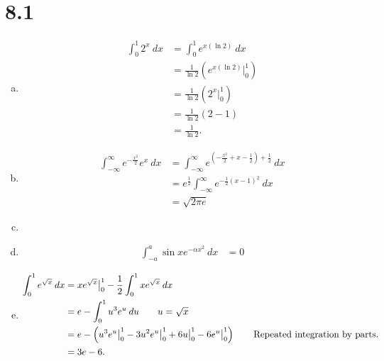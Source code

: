 \documentclass[10pt]{mypackage}
\begin{document}
\RaggedRight
\section{8.1}%
\begin{enumerate}[(a)]
  \item 
    \begin{align*}
      \int_{0}^{1} 2^x\:dx &= \int_{0}^{1} e^{x\left(\ln 2\right)}\:dx\\
                           &= \frac{1}{\ln 2}\left(e^{x\left(\ln 2\right)}\bigr\vert_{0}^{1}\right)\tag*{$u = x\left(\ln 2\right)$}\\
                           &= \frac{1}{\ln 2}\left(2^{x}\bigr\vert_{0}^{1}\right)\\
                           &= \frac{1}{\ln 2}\left(2-1\right)\\
                           &= \frac{1}{\ln 2}.
    \end{align*}
  \item
    \begin{align*}
      \int_{-\infty}^{\infty} e^{-\frac{x^2}{2}}e^{x}\:dx &= \int_{-\infty}^{\infty} e^{\left(-\frac{x^2}{2} + x - \frac{1}{2} \right)+ \frac{1}{2}}\:dx\tag*{Completing the square.}\\
                                                          &= e^{\frac{1}{2}}\int_{-\infty}^{\infty}e^{-\frac{1}{2}\left(x-1\right)^2} \:dx\\
                                                          &= \sqrt{2\pi e}\tag*{Gaussian Integral}
    \end{align*}
  \item 
  \item 
    \begin{align*}
      \int_{-a}^{a} \sin x e^{-\alpha x^2}\:dx &= 0 \tag*{Even/odd.}
    \end{align*}
  \item 
    \begin{align*}
      \int_{0}^{1} e^{\sqrt{x}}\:dx &= xe^{\sqrt{x}}\bigr\vert_{0}^{1} - \frac{1}{2}\int_{0}^{1} xe^{\sqrt{x}}\:dx\\
                                    &= e - \int_{0}^{1} u^3e^{u}\:du\tag*{$u = \sqrt{x}$}\\
                                    &= e - \left(u^3e^{u}\bigr\vert_{0}^{1} - 3u^2e^{u}\bigr\vert_{0}^{1} + 6u\bigr\vert_{0}^{1} - 6e^{u}\bigr\vert_{0}^{1}\right)\tag*{Repeated integration by parts.}\\
                                    &= 3e-6.

\end{align*}
\end{enumerate}
\end{document}
